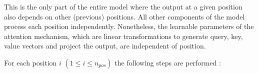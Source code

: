 This is the only part of the entire model where the output at a given position also depends on other (previous) positions. All other components of the model process each position independently.
Nonetheless, the learnable parameters of the attention mechanism, which are linear transformations to generate query, key, value vectors and project the output, are independent of position.


For each position $i$ $(1 \leq i \leq n_{pos})$ the following steps are performed  \cite{alammar-transformer} \cite{alammar-gpt2}:


